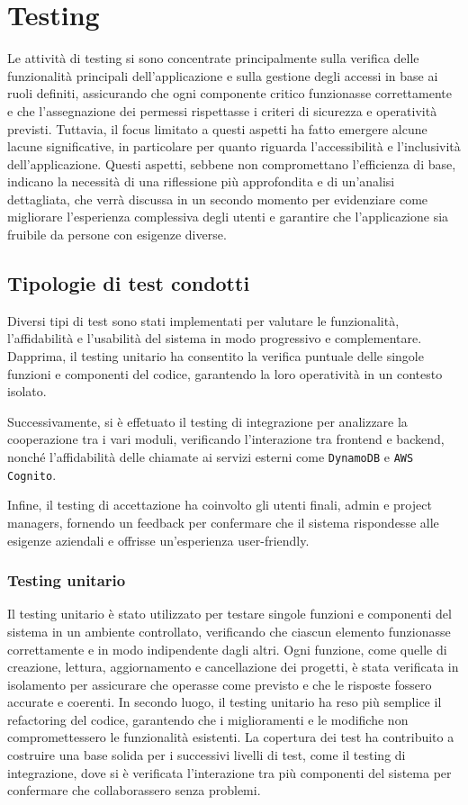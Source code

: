 \documentclass[target=bach,aauheader=,style=]{thud}
\begin{document}
\chapter{Testing}
Le attività di testing si sono concentrate principalmente sulla verifica delle funzionalità principali dell'applicazione e sulla gestione degli accessi in base ai ruoli definiti, assicurando che ogni componente critico funzionasse correttamente e che l'assegnazione dei permessi rispettasse i criteri di sicurezza e operatività previsti. Tuttavia, il focus limitato a questi aspetti ha fatto emergere alcune lacune significative, in particolare per quanto riguarda l'accessibilità e l'inclusività dell'applicazione. Questi aspetti, sebbene non compromettano l'efficienza di base, indicano la necessità di una riflessione più approfondita e di un'analisi dettagliata, che verrà discussa in un secondo momento per evidenziare come migliorare l'esperienza complessiva degli utenti e garantire che l'applicazione sia fruibile da persone con esigenze diverse.

\section{Tipologie di test condotti}
Diversi tipi di test sono stati implementati per valutare le funzionalità, l'affidabilità e l'usabilità del sistema in modo progressivo e complementare. Dapprima, il testing unitario ha consentito la verifica puntuale delle singole funzioni e componenti del codice, garantendo la loro operatività in un contesto isolato. 

\noindent Successivamente, si è effetuato il testing di integrazione per analizzare la cooperazione tra i vari moduli, verificando l'interazione tra frontend e backend, nonché l'affidabilità delle chiamate ai servizi esterni come \texttt{DynamoDB} e \texttt{AWS Cognito}. 

\noindent Infine, il testing di accettazione ha coinvolto gli utenti finali, admin e project managers, fornendo un feedback per confermare che il sistema rispondesse alle esigenze aziendali e offrisse un'esperienza user-friendly.

\subsection{Testing unitario}
Il testing unitario è stato utilizzato per testare singole funzioni e componenti del sistema in un ambiente controllato, verificando che ciascun elemento funzionasse correttamente e in modo indipendente dagli altri. Ogni funzione, come quelle di creazione, lettura, aggiornamento e cancellazione dei progetti, è stata verificata in isolamento per assicurare che operasse come previsto e che le risposte fossero accurate e coerenti. In secondo luogo, il testing unitario ha reso più semplice il refactoring del codice, garantendo che i miglioramenti e le modifiche non compromettessero le funzionalità esistenti. La copertura dei test ha contribuito a costruire una base solida per i successivi livelli di test, come il testing di integrazione, dove si è verificata l'interazione tra più componenti del sistema per confermare che collaborassero senza problemi.
\end{document}
